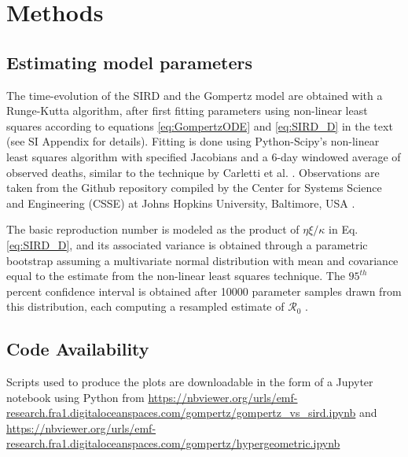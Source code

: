 \documentclass{article}
\begin{document}
\section*{Methods}

\subsection*{Estimating model parameters}
The time-evolution of the SIRD and the Gompertz model are obtained with a Runge-Kutta algorithm, after first fitting parameters using non-linear least squares according to equations \ref{eq:GompertzODE} and \ref{eq:SIRD_D} in the text (see SI Appendix for details). 
Fitting is done using Python-Scipy's non-linear least squares algorithm with specified Jacobians and a 6-day windowed average of observed deaths, similar to the technique by Carletti et al. \cite{carletti2020covid}. 
Observations are taken from the Github repository compiled by the Center for Systems Science and Engineering (CSSE) at Johns Hopkins University, Baltimore, USA \cite{dong2020interactive}. 


The basic reproduction number is modeled as the product of $\eta \xi / \kappa$ in Eq. \ref{eq:SIRD_D}, and its associated variance is obtained through a parametric bootstrap assuming a multivariate normal distribution with mean and covariance equal to the estimate from the non-linear least squares technique. The $95^{th}$ percent confidence interval is obtained after 10000 parameter samples drawn from this distribution, each computing a resampled estimate of $\mathcal{R}_0$ \cite{efron2012bayesian}.

\subsection*{Code Availability}

Scripts used to produce the plots are downloadable in the form of a Jupyter notebook using Python from 
\newline
\url{https://nbviewer.org/urls/emf-research.fra1.digitaloceanspaces.com/gompertz/gompertz_vs_sird.ipynb}
and 
\url{https://nbviewer.org/urls/emf-research.fra1.digitaloceanspaces.com/gompertz/hypergeometric.ipynb}
\end{document}
